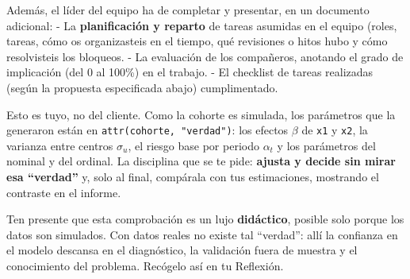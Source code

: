 \documentclass[
  letterpaper,
  DIV=11,
  numbers=noendperiod]{scrartcl}
\begin{document}
\begin{tcolorbox}[enhanced jigsaw, coltitle=black, rightrule=.15mm, arc=.35mm, leftrule=.75mm, colback=white, colbacktitle=quarto-callout-important-color!10!white, left=2mm, breakable, toptitle=1mm, toprule=.15mm, bottomtitle=1mm, titlerule=0mm, title=\textcolor{quarto-callout-important-color}{\faExclamation}\hspace{0.5em}{Importante}, bottomrule=.15mm, opacityback=0, opacitybacktitle=0.6, colframe=quarto-callout-important-color-frame]

Además, el líder del equipo ha de completar y presentar, en un documento
adicional: - La \textbf{planificación y reparto} de tareas asumidas en
el equipo (roles, tareas, cómo os organizasteis en el tiempo, qué
revisiones o hitos hubo y cómo resolvisteis los bloqueos. - La
evaluación de los compañeros, anotando el grado de implicación (del 0 al
100\%) en el trabajo. - El checklist de tareas realizadas (según la
propuesta especificada abajo) cumplimentado.

\end{tcolorbox}

\begin{tcolorbox}[enhanced jigsaw, coltitle=black, rightrule=.15mm, arc=.35mm, leftrule=.75mm, colback=white, colbacktitle=quarto-callout-tip-color!10!white, left=2mm, breakable, toptitle=1mm, toprule=.15mm, bottomtitle=1mm, titlerule=0mm, title=\textcolor{quarto-callout-tip-color}{\faLightbulb}\hspace{0.5em}{Control de calidad interno: ajusta a ciegas y valida contra el DGP}, bottomrule=.15mm, opacityback=0, opacitybacktitle=0.6, colframe=quarto-callout-tip-color-frame]

Esto es tuyo, no del cliente. Como la cohorte es simulada, los
parámetros que la generaron están en \texttt{attr(cohorte,\ "verdad")}:
los efectos \(\beta\) de \texttt{x1} y \texttt{x2}, la varianza entre
centros \(\sigma_u\), el riesgo base por periodo \(\alpha_t\) y los
parámetros del nominal y del ordinal. La disciplina que se te pide:
\textbf{ajusta y decide sin mirar esa ``verdad''} y, solo al final,
compárala con tus estimaciones, mostrando el contraste en el informe.

Ten presente que esta comprobación es un lujo \textbf{didáctico},
posible solo porque los datos son simulados. Con datos reales no existe
tal ``verdad'': allí la confianza en el modelo descansa en el
diagnóstico, la validación fuera de muestra y el conocimiento del
problema. Recógelo así en tu Reflexión.

\end{tcolorbox}
\end{document}
